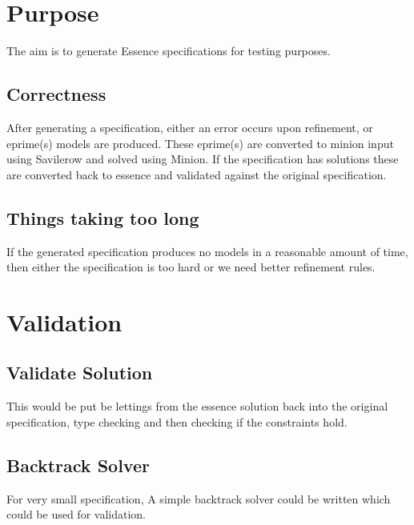 %
%
%
%
%
%
%
\maketitle

\section{Purpose}

The aim is to generate Essence specifications for testing purposes.

\subsection{Correctness}

After generating a specification, either an error occurs upon refinement, or eprime(s) models are produced.  These eprime(s) are converted to minion input using Savilerow and solved using Minion. If the specification has solutions these are converted back to essence and validated against the original specification. 

\subsection{Things taking too long}

If the generated specification produces no models  in a reasonable amount of time, then either the specification is too hard or we need better refinement rules.

\section{Validation}

\subsection{Validate Solution}

This would be put be lettings from the essence solution back into the original specification, type checking and then checking if the constraints hold.

\subsection{Backtrack Solver}

For very small specification, A simple backtrack solver could be written which could be used for validation.

